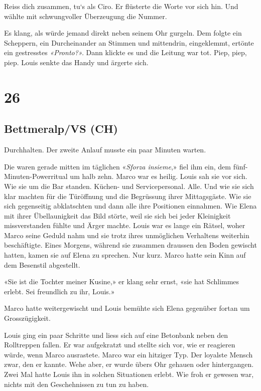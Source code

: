 Reiss dich zusammen, tu`s als Ciro. Er flüsterte die Worte vor sich hin.
Und wählte mit schwungvoller Überzeugung die Nummer.

Es klang, als würde jemand direkt neben seinem Ohr gurgeln. Dem folgte
ein Scheppern, ein Durcheinander an Stimmen und mittendrin, eingeklemmt,
ertönte ein gestresstes \emph{«Pronto?».} Dann klickte es und die
Leitung war tot. Piep, piep, piep. Louis senkte das Handy und ärgerte
sich.

\chapter{26}\label{section-25}

\section{Bettmeralp/VS (CH)}\label{bettmeralpvs-ch}

Durchhalten. Der zweite Anlauf musste ein paar Minuten warten.

Die waren gerade mitten im täglichen «\emph{Sforza insieme},» fiel ihm
ein, dem fünf-Minuten-Powerritual um halb zehn. Marco war es heilig.
Louis sah sie vor sich. Wie sie um die Bar standen. Küchen- und
Servicepersonal. Alle. Und wie sie sich klar machten für die Türöffnung
und die Begrüssung ihrer Mittagsgäste. Wie sie sich gegenseitig
abklatschten und dann alle ihre Positionen einnahmen. Wie Elena mit
ihrer Übellaunigkeit das Bild störte, weil sie sich bei jeder
Kleinigkeit missverstanden fühlte und Ärger machte. Louis war es lange
ein Rätsel, woher Marco seine Geduld nahm und sie trotz ihres
unmöglichen Verhaltens weiterhin beschäftigte. Eines Morgens, während
sie zusammen draussen den Boden gewischt hatten, kamen sie auf Elena zu
sprechen. Nur kurz. Marco hatte sein Kinn auf dem Besenstil abgestellt.

«Sie ist die Tochter meiner Kusine,» er klang sehr ernst, «sie hat
Schlimmes erlebt. Sei freundlich zu ihr, Louis.»

Marco hatte weitergewischt und Louis bemühte sich Elena gegenüber fortan
um Grosszügigkeit.

Louis ging ein paar Schritte und liess sich auf eine Betonbank neben den
Rolltreppen fallen. Er war aufgekratzt und stellte sich vor, wie er
reagieren würde, wenn Marco ausrastete. Marco war ein hitziger Typ. Der
loyalste Mensch zwar, den er kannte. Wehe aber, er wurde übers Ohr
gehauen oder hintergangen. Zwei Mal hatte Louis ihn in solchen
Situationen erlebt. Wie froh er gewesen war, nichts mit den
Geschehnissen zu tun zu haben.


